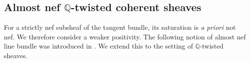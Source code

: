\documentclass[english,reqno]{amsart}
\newcommand\bbQ{{\mathbb Q}}
\newcommand\sE{{\mathscr E}}
\theoremstyle{plain}
\theoremstyle{definition}
\numberwithin{equation}{section} %
\begin{document}

\subsection{Almost nef $\bbQ$-twisted coherent sheaves}

For a  strictly nef subsheaf of the tangent bundle, its saturation is \textit{a priori} not nef.   We therefore consider a weaker positivity. The following notion of almost nef line bundle was introduced in \cite{DemaillyPeternellSchneider2001}. We extend this to the setting of $\mathbb{Q}$-twisted sheaves.
\end{document}

